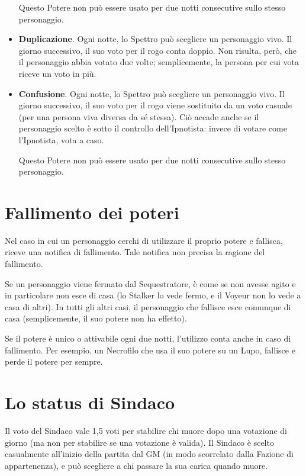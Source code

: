 \documentclass[a4paper,10pt]{article}
\begin{document}
\begin{itemize}
 Questo Potere non può essere usato per due notti consecutive sullo stesso personaggio.
 
 \item {\bf Duplicazione}. Ogni notte, lo Spettro può scegliere un personaggio vivo. Il giorno successivo, il suo voto per il rogo conta doppio. Non risulta, però, che il personaggio abbia votato due volte; semplicemente, la persona per cui vota riceve un voto in più.
 
 \item {\bf Confusione}.  Ogni notte, lo Spettro può scegliere un personaggio vivo. Il giorno successivo, il suo voto per il rogo viene sostituito da un voto casuale (per una persona viva diversa da sé stessa). Ciò accade anche se il personaggio scelto è sotto il controllo dell'Ipnotista: invece di votare come l'Ipnotista, vota a caso.
 
  Questo Potere non può essere usato per due notti consecutive sullo stesso personaggio.

\end{itemize}


\section{Fallimento dei poteri}

Nel caso in cui un personaggio cerchi di utilizzare il proprio potere e fallisca, riceve una notifica di fallimento. Tale notifica non precisa la ragione del fallimento.

Se un personaggio viene fermato dal Sequestratore, è come se non avesse agito e in particolare non esce di casa (lo Stalker lo vede fermo, e il Voyeur non lo vede a casa di altri).
In tutti gli altri casi, il personaggio che fallisce esce comunque di casa (semplicemente, il suo potere non ha effetto).

Se il potere è unico o attivabile ogni due notti, l'utilizzo conta anche in caso di fallimento. Per esempio, un Necrofilo che usa il suo potere su un Lupo, fallisce e perde il potere per sempre.

\section{Lo status di Sindaco}

Il voto del Sindaco vale 1,5 voti per stabilire chi muore dopo una votazione di giorno (ma non per stabilire se una votazione è valida).
Il Sindaco è scelto casualmente all'inizio della partita dal GM (in modo scorrelato dalla Fazione di appartenenza), e può scegliere a chi passare la sua carica quando muore.
\end{document}
